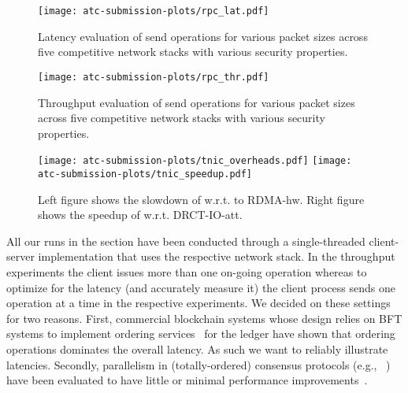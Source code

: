 \begin{figure*}
    \centering
   \texttt{[image: atc-submission-plots/rpc\_lat.pdf]} 
  \caption{Latency evaluation of send operations for various packet sizes across five competitive network stacks with various security properties.}
  \label{fig:net_latencies}
\end{figure*}

\begin{figure}
    \centering
   \texttt{[image: atc-submission-plots/rpc\_thr.pdf]} 
    \caption{Throughput evaluation of send operations for various packet sizes across five competitive network stacks with various security properties.}
  \label{fig:net_throughput}
\end{figure}

\begin{figure}[t!]
\begin{center}
  \centering
  \texttt{[image: atc-submission-plots/tnic\_overheads.pdf]} 
\endminipage
{}
  \centering
  \texttt{[image: atc-submission-plots/tnic\_speedup.pdf]} 
\endminipage
\end{center}
\caption{Left figure shows the slowdown of \projecttitle{} w.r.t. to RDMA-hw. Right figure shows the speedup of \projecttitle{} w.r.t. DRCT-IO-att.}\label{fig:net_slowdown}
\end{figure}

 All our runs in the section have been conducted through a single-threaded client-server implementation that uses the respective network stack. In the throughput experiments the client issues more than one on-going operation whereas to optimize for the latency (and accurately measure it) the client process sends one operation at a time in the respective experiments.  We decided on these settings for two reasons. First, commercial blockchain systems whose design relies on BFT systems to implement ordering services~\cite{10.1145/3190508.3190538} for the ledger have shown that ordering operations dominates the overall latency. As such we want to reliably illustrate \projecttitle{} latencies. Secondly, parallelism in (totally-ordered) consensus protocols (e.g., ~\cite{10.1145/3190508.3190538}) have been evaluated to have little or minimal performance improvements~\cite{f04eb9b864204bab958e72055062748c, 10.1145/3299869.3319893}.

